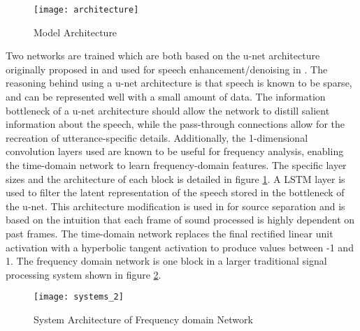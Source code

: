 \begin{figure}[h]
\begin{center}
	\texttt{[image: architecture]}
	\caption{Model Architecture}
	\label{fig:architecture}
\end{center}
\end{figure}

\noindent Two networks are trained which are both based on the u-net architecture originally proposed in \cite{ronneberger_u-net_2015} and used for speech enhancement/denoising in \cite{pandey_new_2019}.  The reasoning behind using a u-net architecture is that speech is known to be sparse, and can be represented well with a small amount of data. The information bottleneck of a u-net architecture should allow the network to distill salient information about the speech, while the pass-through connections allow for the recreation of utterance-specific details. Additionally, the 1-dimensional convolution layers used are known to be useful for frequency analysis, enabling the time-domain network to learn frequency-domain features. The specific layer sizes and the architecture of each block is detailed in figure \ref{fig:architecture}. A \ac{LSTM} layer is used to filter the latent representation of the speech stored in the bottleneck of the u-net. This architecture modification is used in \cite{defossez_music_nodate} for source separation and is based on the intuition that each frame of sound processed is highly dependent on past frames. The time-domain network replaces the final rectified linear unit activation with a hyperbolic tangent activation to produce values between -1 and 1. The frequency domain network is one block in a larger traditional signal processing system shown in figure \ref{fig:systems}.

\begin{figure}[h]
	\centering
	\texttt{[image: systems\_2]}
	\caption{System Architecture of Frequency domain Network}
	\label{fig:systems}
\end{figure}
